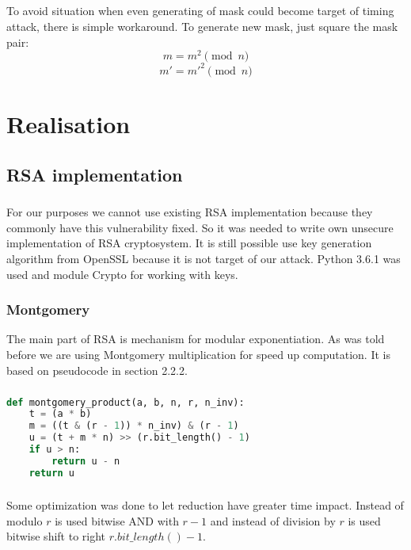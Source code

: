 \documentclass[thesis=B,english]{FITthesis}[2012/10/20]
\begin{document}
{\paragraph*{}{
To avoid situation when even generating of mask could become target of timing attack, there is simple workaround. To generate new mask, just square the mask pair:\cite{Kocher1996}
\[m = m^2 \pmod{n}\]
\[m' = m'^2 \pmod{n}\]

}

\chapter{Realisation}

\section{RSA implementation}

\paragraph*{}{
For our purposes we cannot use existing RSA implementation because they commonly have this vulnerability fixed. So it was needed to write own unsecure implementation of RSA cryptosystem.
It is still possible use key generation algorithm from OpenSSL because it is not target of our attack. Python 3.6.1 was used and module Crypto for working with keys.
}
\subsection{Montgomery}{
The main part of RSA is mechanism for modular exponentiation. As was told before we are using Montgomery multiplication for speed up computation. It is based on pseudocode in section 2.2.2.
}
\paragraph*{}
\begin{lstlisting}[language=Python]
def montgomery_product(a, b, n, r, n_inv):
    t = (a * b)
    m = ((t & (r - 1)) * n_inv) & (r - 1)
    u = (t + m * n) >> (r.bit_length() - 1)
    if u > n:
        return u - n
    return u
\end{lstlisting}

\paragraph*{}{
Some optimization was done to let reduction have greater time impact. Instead of modulo \(r\) is used bitwise AND with \(r-1\) and instead of division by \(r\) is used bitwise
shift to right \(r.bit\_length() - 1\).
}

}
\end{document}
